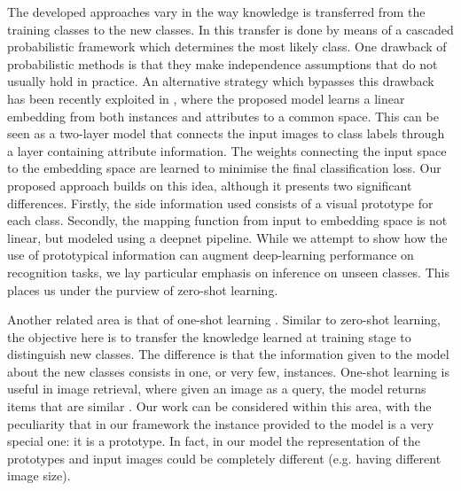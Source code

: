 \documentclass{bmvc2k}
\begin{document}
The developed approaches vary in the way knowledge is transferred from the training classes 
to the new classes. In \cite{Lampert2014,Suzuki2014} this transfer is done by
means of a cascaded probabilistic framework which determines the most likely class. One drawback of
probabilistic methods is that they make independence assumptions that do not
usually hold in practice. An alternative strategy which bypasses this drawback
has been recently exploited in
\cite{akata2013label,romera2015embarrassingly,weston2011wsabie}, where the
proposed model learns a linear embedding from both instances and attributes to a common space.
This can be seen as a two-layer model that connects the input images to class
labels through a layer containing attribute information. The weights connecting
the input space to the embedding space are learned to minimise the final
classification loss. Our proposed approach builds on this idea, although it presents two
significant differences. Firstly, the side information used consists of a
visual prototype for each class. Secondly, the mapping function from input to
embedding space is not linear, but modeled using a deepnet pipeline.
While we attempt to show how the use of prototypical information can augment deep-learning
performance on recognition tasks, we lay particular emphasis on inference on unseen classes.
This places us under the purview of zero-shot learning.
\fi\iffalse
With datasets such as for traffic signs or brand logos, the classification task amounts to a
fine-grained recognition. In this case, manually identifying visual attributes to uniquely define
each class is not only laborious but almost impossible with very small semantic difference between
some classes as in Fig. Establishing natural language semantics for these datasets is also not trivial. 
In case of brand logos, the class names have an ambiguous, often unrelated, natural language context. 
In case of traffic signs, the road sign phrases are difficult to mine preserving their complete meaning. 
Thus, in a first of its kind, we use canonical templates or prototypes to define the output embedding space.
\fi

Another related area is that of one-shot learning
\cite{bart2005cross,lake2011one,fei2006one}. Similar to zero-shot learning, the objective here is
to transfer the knowledge learned at training stage to distinguish new classes.
The difference is that the information given to the model about the new classes
consists in one, or very few, instances.
One-shot learning is useful in image retrieval, where given an image as a query,
the model returns items that are similar \cite{seanBell2015}. Our work can be considered within this area, with the peculiarity that in
our framework the instance provided to the model is a very special one: it is a prototype. 
In fact, in our model the representation of the prototypes and input images could
be completely different (e.g. having different image size).
\end{document}
